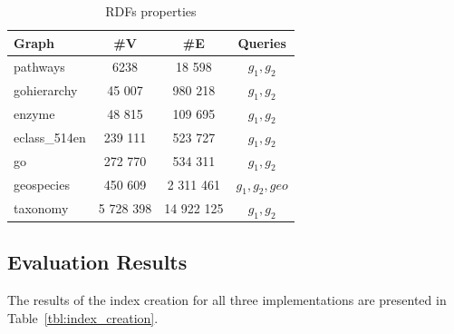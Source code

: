 {\setlength{\tabcolsep}{0.25em}
	\begin{table}
		{
			\caption{RDFs properties}
			\label{tbl:propRDF}
			\small
			\begin{tabular}{|l|c|c|c|}
				\hline
				Graph & \#V & \#E & Queries \\
				\hline
				\hline
				pathways               & 6238                 & 18 598               & $g_1, g_2$ \\
				gohierarchy            & 45 007               & 980 218              & $g_1, g_2$ \\
				enzyme                 & 48 815               & 109 695              & $g_1, g_2$ \\
				eclass\_514en          & 239 111              & 523 727              & $g_1, g_2$ \\
				go                     & 272 770              & 534 311              & $g_1, g_2$ \\
				geospecies             & 450 609              & 2 311 461            & $g_1, g_2, geo$  \\
				taxonomy                   & 5 728 398                 & 14 922 125                 & $g_1, g_2$ \\
				\hline
			\end{tabular}
		}
	\end{table}
}


\subsection{Evaluation Results}
The results of the index creation for all three implementations are presented in Table~\ref{tbl:index_creation}.

